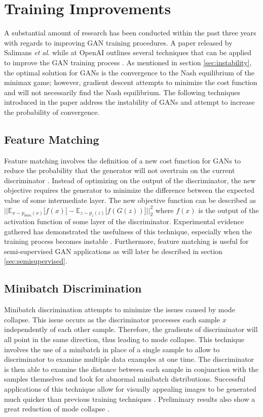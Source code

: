 \documentclass[11pt]{article}
\begin{document}
\section{Training Improvements}
A substantial amount of research has been conducted within the past three years with regards to improving GAN training procedures. A paper released by Salimans \textit{et al.} while at OpenAI outlines several techniques that can be applied to improve the GAN training process \citep{2016arXiv160603498S}. As mentioned in section \ref{sec:instability}, the optimal solution for GANs is the convergence to the Nash equilibrium of the minimax game; however, gradient descent attempts to minimize the cost function and will not necessarily find the Nash equilibrium. The following techniques introduced in the paper address the instability of GANs and attempt to increase the probability of convergence.

\subsection{Feature Matching}
Feature matching involves the definition of a new cost function for GANs to reduce the probability that the generator will not overtrain on the current discriminator \citep{2016arXiv160603498S}. Instead of optimizing on the output of the discriminator, the new objective requires the generator to minimize the difference between the expected value of some intermediate layer. The new objective function can be described as $\Big|\Big|\mathbb{E}_{x\sim p_{data}(x)}\Big[f(x)\Big] - \mathbb{E}_{z\sim p_{z}(z)}\Big[f(G(z))\Big]\Big|\Big|_2^2$ where $f(x)$ is the output of the activation function of some layer of the discriminator. Experimental evidence gathered has demonstrated the usefulness of this technique, especially when the training process becomes instable \citep{2016arXiv160603498S}. Furthermore, feature matching is useful for semi-supervised GAN applications as will later be described in section \ref{sec:semisupervised}.

\subsection{Minibatch Discrimination} \label{sec:minidisc}
Minibatch discrimination attempts to minimize the issues caused by mode collapse. This issue occurs as the discriminator processes each sample $x$ independently of each other sample. Therefore, the gradients of discriminator will all point in the same direction, thus leading to mode collapse. This technique involves the use of a minibatch in place of a single sample to allow to discriminator to examine multiple data examples at one time. The discriminator is then able to examine the distance between each sample in conjunction with the samples themselves and look for abnormal minibatch distributions. Successful applications of this technique allow for visually appealing images to be generated much quicker than previous training techniques \citep{2016arXiv160603498S}. Preliminary results also show a great reduction of mode collapse \citep{2017arXiv170100160G}.
\end{document}
